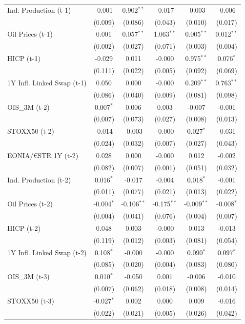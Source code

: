 \begin{longtable}[t]{lccccc}
Ind. Production (t-1) & -0.001 & 0.902$^{**}$ & -0.017 & -0.003 & -0.006\\
 & (0.009) & (0.086) & (0.043) & (0.010) & (0.017)\\
Oil Prices (t-1) & 0.001 & 0.057$^{**}$ & 1.063$^{**}$ & 0.005$^{**}$ & 0.012$^{**}$\\
 & (0.002) & (0.027) & (0.071) & (0.003) & (0.004)\\
HICP (t-1) & -0.029 & 0.011 & -0.000 & 0.975$^{**}$ & 0.076$^{*}$\\
 & (0.111) & (0.022) & (0.005) & (0.092) & (0.069)\\
1Y Infl. Linked Swap (t-1) & 0.050 & 0.000 & -0.000 & 0.209$^{**}$ & 0.763$^{**}$\\
 & (0.086) & (0.040) & (0.009) & (0.081) & (0.098)\\
OIS\_3M (t-2) & 0.007$^{*}$ & 0.006 & 0.003 & -0.007 & -0.001\\
 & (0.007) & (0.073) & (0.027) & (0.008) & (0.013)\\
STOXX50 (t-2) & -0.014 & -0.003 & -0.000 & 0.027$^{*}$ & -0.031\\
 & (0.024) & (0.032) & (0.007) & (0.027) & (0.043)\\
EONIA/€STR 1Y (t-2) & 0.028 & 0.000 & -0.000 & 0.012 & -0.002\\
 & (0.082) & (0.007) & (0.001) & (0.051) & (0.032)\\
Ind. Production (t-2) & 0.016$^{*}$ & -0.017 & -0.004 & 0.018$^{*}$ & -0.001\\
 & (0.011) & (0.077) & (0.021) & (0.013) & (0.022)\\
Oil Prices (t-2) & -0.004$^{*}$ & -0.106$^{**}$ & -0.175$^{**}$ & -0.009$^{**}$ & -0.008$^{*}$\\
 & (0.004) & (0.041) & (0.076) & (0.004) & (0.007)\\
HICP (t-2) & 0.048 & 0.003 & -0.000 & 0.013 & -0.013\\
 & (0.119) & (0.012) & (0.003) & (0.081) & (0.054)\\
1Y Infl. Linked Swap (t-2) & 0.108$^{*}$ & -0.000 & -0.000 & 0.090$^{*}$ & 0.097$^{*}$\\
 & (0.085) & (0.020) & (0.004) & (0.083) & (0.080)\\
OIS\_3M (t-3) & 0.010$^{*}$ & -0.050 & 0.001 & -0.006 & -0.010\\
 & (0.007) & (0.062) & (0.018) & (0.008) & (0.014)\\
STOXX50 (t-3) & -0.027$^{*}$ & 0.002 & 0.000 & 0.009 & -0.016\\
 & (0.022) & (0.021) & (0.005) & (0.026) & (0.042)\\

\end{longtable}
